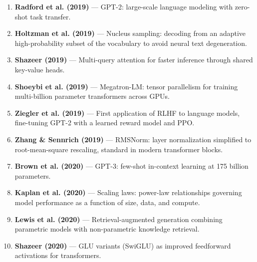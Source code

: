 \begin{enumerate}
\item \textbf{Radford et al. (2019)} --- GPT-2: large-scale language modeling with zero-shot task transfer.

\item \textbf{Holtzman et al. (2019)} --- Nucleus sampling: decoding from an adaptive high-probability subset of the vocabulary to avoid neural text degeneration.

\item \textbf{Shazeer (2019)} --- Multi-query attention for faster inference through shared key-value heads.

\item \textbf{Shoeybi et al. (2019)} --- Megatron-LM: tensor parallelism for training multi-billion parameter transformers across GPUs.

\item \textbf{Ziegler et al. (2019)} --- First application of RLHF to language models, fine-tuning GPT-2 with a learned reward model and PPO.

\item \textbf{Zhang \& Sennrich (2019)} --- RMSNorm: layer normalization simplified to root-mean-square rescaling, standard in modern transformer blocks.

\item \textbf{Brown et al. (2020)} --- GPT-3: few-shot in-context learning at 175 billion parameters.

\item \textbf{Kaplan et al. (2020)} --- Scaling laws: power-law relationships governing model performance as a function of size, data, and compute.

\item \textbf{Lewis et al. (2020)} --- Retrieval-augmented generation combining parametric models with non-parametric knowledge retrieval.

\item \textbf{Shazeer (2020)} --- GLU variants (SwiGLU) as improved feedforward activations for transformers.

\end{enumerate}
